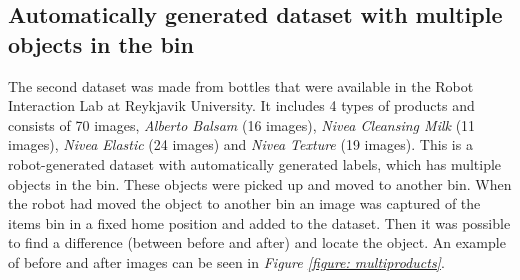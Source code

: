 \subsection{Automatically generated dataset with multiple objects in the bin} \label{sec:multidataset}
The second dataset was made from bottles that were available in the Robot Interaction Lab at Reykjavik University. It includes 4 types of products and consists of 70 images, \textit{Alberto Balsam} (16 images), \textit{Nivea Cleansing Milk} (11 images), \textit{Nivea Elastic} (24 images) and \textit{Nivea Texture} (19 images). 
This is a robot-generated dataset with automatically generated labels, which has multiple objects in the bin. 
These objects were picked up and moved to another bin. When the robot had moved the object to another bin an image was captured of the items bin in a fixed home position and added to the dataset. Then it was possible to find a difference (between before and after) and locate the object.
An example of before and after images can be seen in \textit{Figure \ref{figure: multiproducts}}. 

